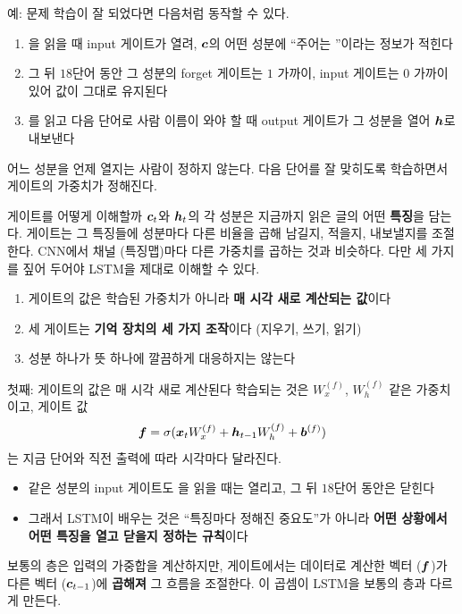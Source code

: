 \documentclass[aspectratio=169,11pt]{beamer}
\begin{document}
\begin{frame}{예:  문제}
학습이 잘 되었다면 다음처럼 동작할 수 있다.
\vskip1mm
\begin{enumerate}
\item {}을 읽을 때 input 게이트가 열려,
$\bm{c}$의 어떤 성분에 ``주어는 ''이라는 정보가 적힌다
\item 그 뒤 $18$단어 동안 그 성분의 forget 게이트는 $1$ 가까이, input 게이트는 $0$ 가까이 있어
값이 그대로 유지된다
\item {}를 읽고 다음 단어로 사람 이름이 와야 할 때 output 게이트가 그 성분을 열어 $\bm{h}$로 내보낸다
\end{enumerate}
\vskip3mm
\begin{keybox}
어느 성분을 언제 열지는 사람이 정하지 않는다.
다음 단어를 잘 맞히도록 학습하면서 게이트의 가중치가 정해진다.
\end{keybox}
\end{frame}

\begin{frame}{게이트를 어떻게 이해할까}
$\bm{c}_t$와 $\bm{h}_t$의 각 성분은 지금까지 읽은 글의 어떤 \textbf{특징}을 담는다.
게이트는 그 특징들에 성분마다 다른 비율을 곱해 남길지, 적을지, 내보낼지를 조절한다.
CNN에서 채널 (특징맵)마다 다른 가중치를 곱하는 것과 비슷하다.
\vskip3mm
다만 세 가지를 짚어 두어야 LSTM을 제대로 이해할 수 있다.
\begin{enumerate}
\item 게이트의 값은 학습된 가중치가 아니라 \textbf{매 시각 새로 계산되는 값}이다
\item 세 게이트는 \textbf{기억 장치의 세 가지 조작}이다 (지우기, 쓰기, 읽기)
\item 성분 하나가 뜻 하나에 깔끔하게 대응하지는 않는다
\end{enumerate}
\end{frame}

\begin{frame}{첫째: 게이트의 값은 매 시각 새로 계산된다}
학습되는 것은 $W_x^{(f)}$, $W_h^{(f)}$ 같은 가중치이고, 게이트 값
\[
\bm{f}=\sigma(\bm{x}_tW_x^{(f)}+\bm{h}_{t-1}W_h^{(f)}+\bm{b}^{(f)})
\]
는 지금 단어와 직전 출력에 따라 시각마다 달라진다.
\begin{itemize}
\item 같은 성분의 input 게이트도 을 읽을 때는 열리고, 그 뒤 $18$단어 동안은 닫힌다
\item 그래서 LSTM이 배우는 것은 ``특징마다 정해진 중요도''가 아니라
\textbf{어떤 상황에서 어떤 특징을 열고 닫을지 정하는 규칙}이다
\end{itemize}
\vskip2mm
\begin{keybox}
보통의 층은 입력의 가중합을 계산하지만, 게이트에서는 데이터로 계산한 벡터 ($\bm{f}$)가
다른 벡터 ($\bm{c}_{t-1}$)에 \textbf{곱해져} 그 흐름을 조절한다.
이 곱셈이 LSTM을 보통의 층과 다르게 만든다.
\end{keybox}
\end{frame}
\end{document}

